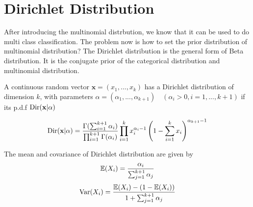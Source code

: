 \section{Dirichlet Distribution}
	After introducing the multinomial distrbution, we know that it can be used to do multi class classification. The problem now is how to set the prior distribution of multinomial distribution? The Dirichlet distribution is the general form of Beta distribution. It is the conjugate prior of the categorical distribution and multinomial distribution.  
	
	\begin{definition}
		A continuous random vector $\textbf{x} = (x_1,...,x_k)$ has a Dirichlet distribution of dimension $k$, with parameters $\alpha = (\alpha_1,...,\alpha_{k+1}) \quad (\alpha_i>0, i = 1,...,k+1)$ if its p.d.f $\mathrm{Dir}(\textbf{x}|\alpha)$
		
		\begin{equation}
			\mathrm{Dir}(\textbf{x}|\alpha) = \frac{\Gamma(\sum_{i =1}^{k+1}\alpha_i)}{\prod_{i=1}^{k+1}\Gamma(\alpha_i)}\prod_{i=1}^{k}x_i^{\alpha_i - 1}\left(1-\sum_{i = 1}^{k}x_i\right)^{\alpha_{k+1}-1}
		\end{equation}
	\end{definition}
	The mean and covariance of Dirichlet distribution are given by
	$$\mathbb{E}(X_i) = \frac{\alpha_i}{\sum_{j = 1}^{k+1}\alpha_j}$$
	$$\mathrm{Var}(X_i) = \frac{\mathbb{E}(X_i) - (1-\mathbb{E}(X_i))}{1+\sum_{j = 1}^{k+1}\alpha_j}$$

